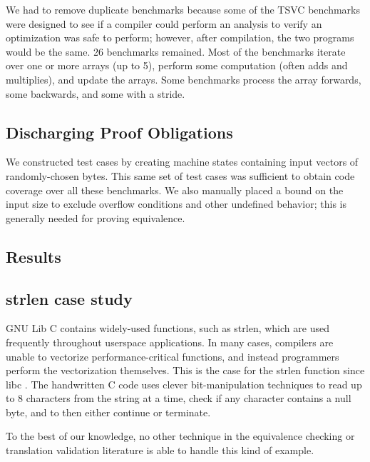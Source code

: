 We had to remove duplicate benchmarks because some of the TSVC
benchmarks were designed to see if a compiler could perform an
analysis to verify an optimization was safe to perform; however,
after compilation, the two programs would be the same. 26 benchmarks
remained. Most of the benchmarks iterate over one or more arrays (up
to 5), perform some computation (often adds and multiplies), and
update the arrays. Some benchmarks process the array forwards, some
backwards, and some with a stride.

\subsection{Discharging Proof Obligations}

We constructed test cases by creating machine states containing input
vectors of randomly-chosen bytes. This same set of test cases was
sufficient to obtain code coverage over all these benchmarks. We
also manually placed a bound on the input size to exclude overflow
conditions and other undefined behavior; this is generally needed for
proving equivalence.









\subsection{Results}

\subsection{strlen case study}

GNU Lib C contains widely-used functions, such as strlen, which are
used frequently throughout userspace applications. In many cases,
compilers are unable to vectorize performance-critical functions, and
instead programmers perform the vectorization themselves. This is the
case for the strlen function since libc . The
handwritten C code uses clever bit-manipulation techniques to read
up to 8 characters from the string at a time, check if any character
contains a null byte, and to then either continue or terminate.

To the best of our knowledge, no other technique in the equivalence
checking or translation validation literature is able to handle this
kind of example. 
